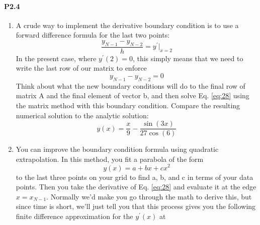 \documentclass{book}
\theoremstyle{plain}
\theoremstyle{definition}
\numberwithin{exm}{chapter}
\theoremstyle{remark}
\theoremstyle{summary}
\theoremstyle{overview}
\begin{document}
\paragraph*{P2.4}
\begin{enumerate}[label=(\alph*)]
\item	A crude way to implement the derivative boundary condition is to use a forward difference formula for the last two points:
	\begin{equation*}
		\frac{y_{N-1}-y_{N-2}}{h} = y^\prime\vert_{x=2}
	\end{equation*}
	In the present case, where $y^\prime(2) = 0$, this simply means that we need to write the last row of our matrix to enforce
	\begin{equation*}
		y_{N-1}-y_{N-2}= 0
	\end{equation*}
	Think about what the new boundary conditions will do to the final row of matrix A and the final element of vector b, and then solve Eq. \eqref{eq:28} using the matrix method with this boundary condition. Compare the resulting numerical solution to the analytic solution:
	\begin{equation*}
		y(x) = \frac{x}{9} - \frac{\sin(3x)}{27\cos(6)}
	\end{equation*}
	\item You can improve the boundary condition formula using quadratic extrapolation. In this method, you fit a parabola of the form
	\begin{equation}\label{eq:29}
		y(x) = a+bx+cx^2
	\end{equation}
	to the last three points on your grid to find a, b, and c in terms of your data points. Then you take the derivative of Eq. \eqref{eq:28} and evaluate it at
the edge $x = x_{N−1}$. Normally we\rq d make you go through the math to
derive this, but since time is short, we\rq ll just tell you that this process
gives you the following finite difference approximation for the $y^\prime(x)$ at

\end{enumerate}
\end{document}
